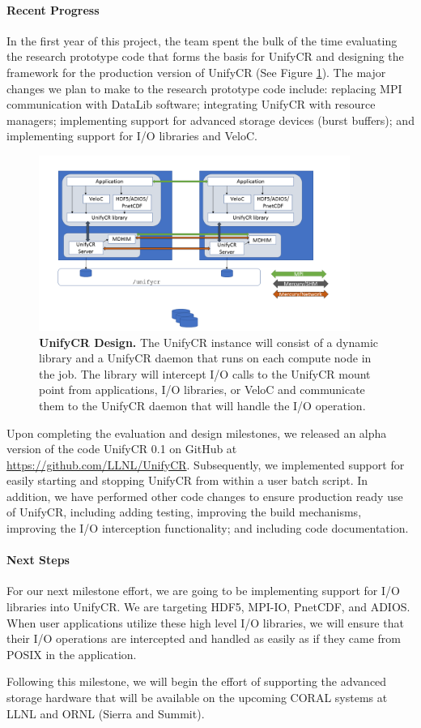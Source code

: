 \paragraph{Recent Progress}

In the first year of this project, the team spent the bulk of the time
evaluating the research prototype code that forms the basis for
UnifyCR and designing the framework for the production version 
of UnifyCR (See Figure \ref{fig:milestone2}). The major changes we plan to make to the research prototype
code include: replacing MPI communication with DataLib software; integrating
UnifyCR with resource managers; implementing support for advanced
storage devices (burst buffers); and implementing support for I/O libraries and 
VeloC. 
\begin{figure}[htb]
        \centering
        \includegraphics[width=4in]{projects/2.3.4-DataViz/2.3.4.07-UNIFYCR/milestone2}
        \caption{\label{fig:milestone2} \textbf{UnifyCR Design.} The UnifyCR
instance will consist of a dynamic library and a UnifyCR daemon that runs
on each compute node in the job. The library will intercept I/O calls to
the UnifyCR mount point from applications, I/O libraries, or VeloC and communicate them to the UnifyCR daemon that will handle the I/O operation.}
\end{figure}


Upon completing the evaluation and design milestones, we released an 
alpha version of the code UnifyCR 0.1 on GitHub at 
\url{https://github.com/LLNL/UnifyCR}. Subsequently, we implemented 
support for easily starting and stopping UnifyCR from within a user
batch script. 
In addition, we have performed other code changes to ensure production
ready use of UnifyCR, including adding testing, improving the build
mechanisms, improving the I/O interception functionality; and including
code documentation.



\paragraph{Next Steps}

For our next milestone effort, we are going to be implementing support
for I/O libraries into UnifyCR. We are targeting HDF5, MPI-IO, PnetCDF, and
ADIOS. When user applications utilize these high level I/O libraries,
we will ensure that their I/O operations are intercepted and 
handled as easily as if they came from POSIX in the application.

Following this milestone, we will begin the effort of supporting 
the advanced storage hardware that will be available on the upcoming
CORAL systems at LLNL and ORNL (Sierra and Summit). 
